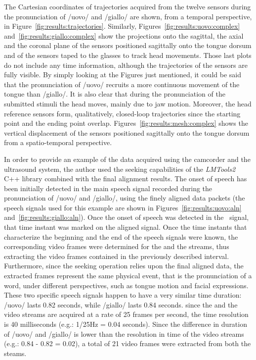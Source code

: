 


The Cartesian coordinates of trajectories acquired from the twelve sensors 
during the pronunciation of /uovo/ and /giallo/ are shown, from a temporal
perspective, in Figure~\ref{fig:results:trajectories}.
Similarly, Figures~\ref{fig:results:uovo:complex}
and~\ref{fig:results:giallo:complex} show the projections onto the sagittal, 
the axial and the coronal plane of the sensors positioned sagittally onto the 
tongue dorsum and of the sensors taped to the glasses to track head movements.
Those last plots do not include any time information, although the
trajectories of the sensors are fully visible.
By simply looking at the Figures just mentioned, it could be said that the
pronunciation of /uovo/ recruits a more continuous movement of the tongue than
/giallo/. 
It is also clear that during the pronunciation of the submitted stimuli the head
moves, mainly due to jaw motion. 
Moreover, the head reference sensors form, qualitatively, closed-loop
trajectories since the starting point and the ending point overlap. 
Figures~\ref{fig:results:mesh:complex} shows the vertical displacement of the
sensors positioned sagittally onto the tongue dorsum from a spatio-temporal 
perspective.



In order to provide an example of the data acquired using the camcorder and the
ultrasound system, the author used the seeking capabilities of the 
\emph{LMTools2} C++ library combined with the final alignment results.
The onset of speech has been initially detected in the  main 
speech signal recorded during the pronunciation of /uovo/ and /giallo/, using
the finely aligned data packets (the speech signals used for this example are
shown in Figures~\ref{fig:results:uovo:aln} and~\ref{fig:results:giallo:aln}).
Once the onset of speech was detected in the~ signal, that
time instant was marked on the aligned  signal.
Once the time instants that characterize the beginning and the end of the
speech signals were known,  the corresponding video
frames were determined for
the  and the  streams, thus
extracting  the video frames contained in the previously described interval.
Furthermore, since the seeking operation relies upon the final aligned data,
the extracted frames represent the same physical event, that is the
pronunciation of a word, under different perspectives, such as tongue motion and
facial expressions.
These two specific speech signals happen
to have a very similar time duration: /uovo/
lasts 0.82 seconds, while /giallo/ lasts 0.84 seconds.
since the  and the  video streams are acquired at a rate 
of 25 frames per second, the time resolution is 40 milliseconds (e.g.: 1/25Hz =
0.04 seconds).
Since the difference in duration of /uovo/ and /giallo/ is lower than the 
resolution in time of the video streams (e.g.: 0.84 - 0.82 = 0.02), a
total of 21 video frames were extracted from both the steams.


